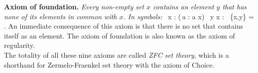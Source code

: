\textbf{Axiom of foundation.} \emph{Every non-empty
set $x$ contains an element $y$ that has none of its elements in common with
$x$. In symbols:}
\bse
\forall \, x : (\exists \,a : a \in x) \imp \exists \, y \in x : \bigcap \,
\{x,y\} = \vn .
\ese
An immediate consequence of this axiom is that there is no set that contains
itself as an element. The axiom of foundation is also known as the axiom of
regularity.\\

The totality of all these nine axioms are called \emph{ZFC set theory}, which
is a shorthand for Zermelo-Fraenkel set theory with the axiom of Choice.
